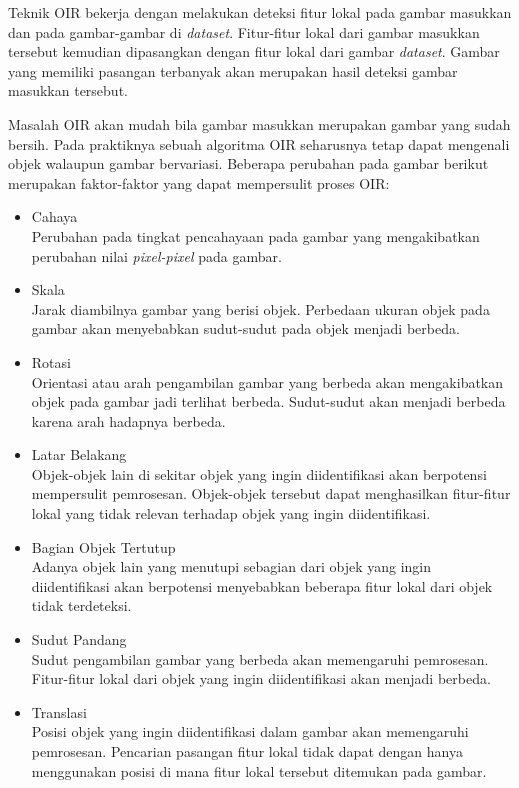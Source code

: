 Teknik OIR bekerja dengan melakukan deteksi fitur lokal pada gambar masukkan dan pada gambar-gambar di \textit{dataset}. Fitur-fitur lokal dari gambar masukkan tersebut kemudian dipasangkan dengan fitur lokal dari gambar \textit{dataset}. Gambar yang memiliki pasangan terbanyak akan merupakan hasil deteksi gambar masukkan tersebut. 

Masalah OIR akan mudah bila gambar masukkan merupakan gambar yang sudah bersih. Pada praktiknya sebuah algoritma OIR seharusnya tetap dapat mengenali objek walaupun gambar bervariasi. Beberapa perubahan pada gambar berikut merupakan faktor-faktor yang dapat mempersulit proses OIR:
\begin{itemize}
	\item Cahaya \\
	Perubahan pada tingkat pencahayaan pada gambar yang mengakibatkan perubahan nilai \textit{pixel-pixel} pada gambar.
	\item Skala \\
	Jarak diambilnya gambar yang berisi objek. Perbedaan ukuran objek pada gambar akan menyebabkan sudut-sudut pada objek menjadi berbeda.
	\item Rotasi \\
	Orientasi atau arah pengambilan gambar yang berbeda akan mengakibatkan objek pada gambar jadi terlihat berbeda. Sudut-sudut akan menjadi berbeda karena arah hadapnya berbeda.
	\item Latar Belakang \\
	Objek-objek lain di sekitar objek yang ingin diidentifikasi akan berpotensi mempersulit pemrosesan. Objek-objek tersebut dapat menghasilkan fitur-fitur lokal yang tidak relevan terhadap objek yang ingin diidentifikasi.
	\item Bagian Objek Tertutup \\
	Adanya objek lain yang menutupi sebagian dari objek yang ingin diidentifikasi akan berpotensi menyebabkan beberapa fitur lokal dari objek tidak terdeteksi.
	\item Sudut Pandang \\
	Sudut pengambilan gambar yang berbeda akan memengaruhi pemrosesan. Fitur-fitur lokal dari objek yang ingin diidentifikasi akan menjadi berbeda.
	\item Translasi \\
	Posisi objek yang ingin diidentifikasi dalam gambar akan memengaruhi pemrosesan. Pencarian pasangan fitur lokal tidak dapat dengan hanya menggunakan posisi di mana fitur lokal tersebut ditemukan pada gambar.
\end{itemize}

